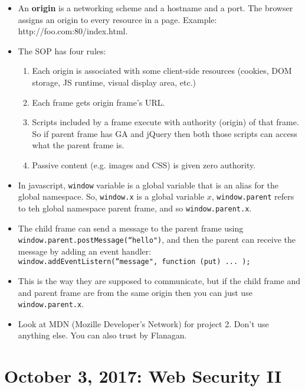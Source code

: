 \documentclass[12pt]{article}
\theoremstyle{definition}
\begin{document}
\begin{itemize}
    \item An \textbf{origin} is a networking scheme and a hostname and a port. The browser assigns an origin to every resource in a page. Example: http://foo.com:80/index.html.
    \item The SOP has four rules:
    \begin{enumerate}
        \item Each origin is associated with some client-side resources (cookies, DOM storage, JS runtime, visual display area, etc.)
        \item Each frame gets origin frame's URL.
        \item Scripts included by a frame execute with authority (origin) of that frame. So if parent frame has GA and jQuery then both those scripts can access what the parent frame is.
        \item Passive content (e.g. images and CSS) is given zero authority.
    \end{enumerate}
    \item In javascript, \texttt{window} variable is a global variable that is an alias for the global namespace. So, \texttt{window.x} is a global variable $x$, \texttt{window.parent} refers to teh global namespace parent frame, and so \texttt{window.parent.x}.
    \item The child frame can send a message to the parent frame using \texttt{window.parent.postMessage(``hello")}, and then the parent can receive the message by adding an event handler:\\ \texttt{window.addEventListern(``message", function (put) ... );}
    \item This is the way they are supposed to communicate, but if the child frame and and parent frame are from the same origin then you can just use \texttt{window.parent.x}.
    \item Look at MDN (Mozille Developer's Network) for project 2. Don't use anything else. You can also trust by Flanagan.
\end{itemize}

\section{October 3, 2017: Web Security II}
\end{document}
